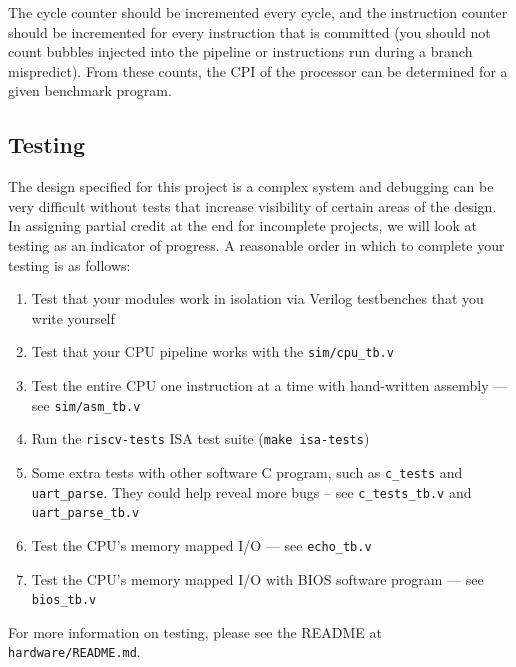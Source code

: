 \documentclass[11pt]{article}
\begin{document}
The cycle counter should be incremented every cycle, and the instruction counter should be incremented for every instruction that is committed (you should not count bubbles injected into the pipeline or instructions run during a branch mispredict).
From these counts, the CPI of the processor can be determined for a given benchmark program.

\subsection{Testing}
\label{testing}
The design specified for this project is a complex system and debugging can be very difficult without tests that increase visibility of certain areas of the design.
In assigning partial credit at the end for incomplete projects, we will look at testing as an indicator of progress.
A reasonable order in which to complete your testing is as follows:

\begin{enumerate}
  \item Test that your modules work in isolation via Verilog testbenches that you write yourself
  \item Test that your CPU pipeline works with the \verb|sim/cpu_tb.v|
  \item Test the entire CPU one instruction at a time with hand-written assembly --- see \verb|sim/asm_tb.v|
  \item Run the \verb|riscv-tests| ISA test suite (\verb|make isa-tests|)
  \item Some extra tests with other software C program, such as \verb|c_tests| and \verb|uart_parse|. They could help reveal more bugs -- see \verb|c_tests_tb.v| and \verb|uart_parse_tb.v|
  \item Test the CPU's memory mapped I/O --- see \verb|echo_tb.v|
  \item Test the CPU's memory mapped I/O with BIOS software program --- see \verb|bios_tb.v|
\end{enumerate}

For more information on testing, please see the README at \verb|hardware/README.md|.


\end{document}
